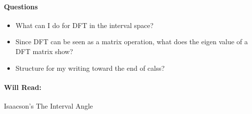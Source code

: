\paragraph*{Questions}
\begin{itemize}
    \item What can I do for DFT in the interval space?
    \item Since DFT can be seen as a matrix operation, what does the eigen value of a DFT matrix show?
    \item Structure for my writing toward the end of calss?
\end{itemize}
\paragraph*{Will Read:}
Isaacson's The Interval Angle
